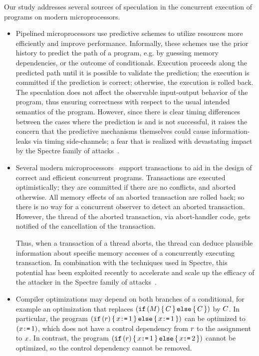 Our study addresses several sources of speculation in the concurrent
execution of programs on modern microprocessors.
\begin{itemize}

\item Pipelined microprocessors use predictive schemes to utilize
  resources more efficiently and improve performance. Informally,
  these schemes use the prior history to predict the path of a
  program, e.g. by guessing memory dependencies, or the outcome of
  conditionals. Execution proceeds along the predicted path until it
  is possible to validate the prediction; the execution is committed
  if the prediction is correct; otherwise, the execution is rolled
  back.  The speculation does not affect the observable input-output
  behavior of the program, thus ensuring correctness with respect to
  the usual intended semantics of the program. However, since there is
  clear timing differences between the cases where the prediction is
  and is not successful, it raises the concern that the predictive
  mechanisms themselves could cause information-leaks via timing
  side-channels; a fear that is realized with devastating impact by
  the Spectre family of attacks~\cite{???}.

\item Several modern microprocessors~\cite{???} support transactions
  to aid in the design of correct and efficient concurrent
  programs. Transactions are executed optimistically; they are
  committed if there are no conflicts, and aborted otherwise. All
  memory effects of an aborted transaction are rolled back; so there
  is no way for a concurrent observer to detect an aborted
  transaction.  However, the thread of the aborted transaction, via
  abort-handler code, gets notified of the cancellation of the
  transaction.

  Thus, when a transaction of a thread aborts, the thread can deduce
  plausible information about specific memory accesses of a
  concurrently executing transaction. In combination with the
  techniques used in Spectre, this potential has been exploited
  recently to accelerate and scale up the efficacy of the attacker in
  the Spectre family of attacks~\cite{???}.

\item Compiler optimizations may depend on both branches of
  a conditional, for example an optimization that replaces
  $(\texttt{if}\,(M)\,\{\, C \,\}\,\texttt{else}\,\{\, C \,\})$ by $C$.
  In particular, the program $(\texttt{if}\,(r)\,\{\, x\texttt{:=}\,1 \,\}\,\texttt{else}\,\{\, x\texttt{:=}\,1 \,\})$
  can be optimized to $(x\texttt{:=}\,1)$, which does not have a control
  dependency from $r$ to the assignment to $x$.
  In contrast, the program $(\texttt{if}\,(r)\,\{\, x\texttt{:=}\,1 \,\}\,\texttt{else}\,\{\, x\texttt{:=}\,2 \,\})$
  cannot be optimized, so the control dependency cannot be removed.


\end{itemize}
